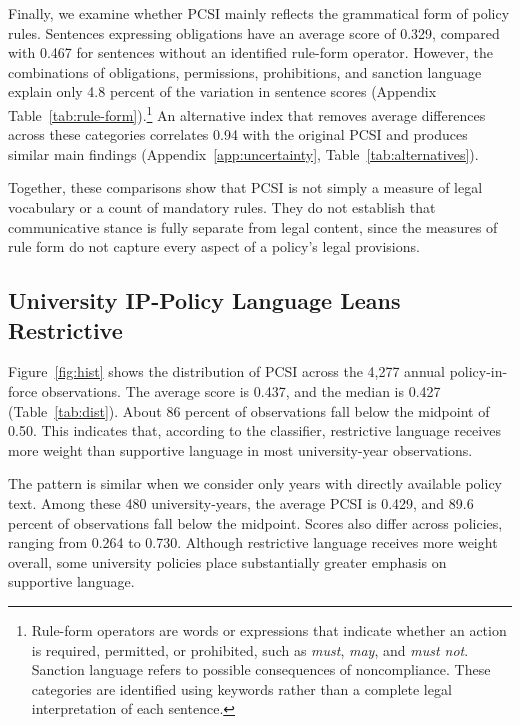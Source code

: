 \documentclass[11pt]{article}
\begin{document}


Finally, we examine whether PCSI mainly reflects the grammatical form of policy rules. Sentences expressing obligations have an average score of 0.329, compared with 0.467 for sentences without an identified rule-form operator. However, the combinations of obligations, permissions, prohibitions, and sanction language explain only 4.8 percent of the variation in sentence scores (Appendix Table~\ref{tab:rule-form}).\footnote{Rule-form operators are words or expressions that indicate whether an action is required, permitted, or prohibited, such as \emph{must}, \emph{may}, and \emph{must not}. Sanction language refers to possible consequences of noncompliance. These categories are identified using keywords rather than a complete legal interpretation of each sentence.} An alternative index that removes average differences across these categories correlates 0.94 with the original PCSI and produces similar main findings (Appendix~\ref{app:uncertainty}, Table~\ref{tab:alternatives}).

Together, these comparisons show that PCSI is not simply a measure of legal vocabulary or a count of mandatory rules. They do not establish that communicative stance is fully separate from legal content, since the measures of rule form do not capture every aspect of a policy's legal provisions.

\subsection{University IP-Policy Language Leans Restrictive}\label{sec:level}

Figure~\ref{fig:hist} shows the distribution of PCSI across the 4,277 annual policy-in-force observations. The average score is 0.437, and the median is 0.427 (Table~\ref{tab:dist}). About 86 percent of observations fall below the midpoint of 0.50. This indicates that, according to the classifier, restrictive language receives more weight than supportive language in most university-year observations.

The pattern is similar when we consider only years with directly available policy text. Among these 480 university-years, the average PCSI is 0.429, and 89.6 percent of observations fall below the midpoint. Scores also differ across policies, ranging from 0.264 to 0.730. Although restrictive language receives more weight overall, some university policies place substantially greater emphasis on supportive language.
\end{document}
